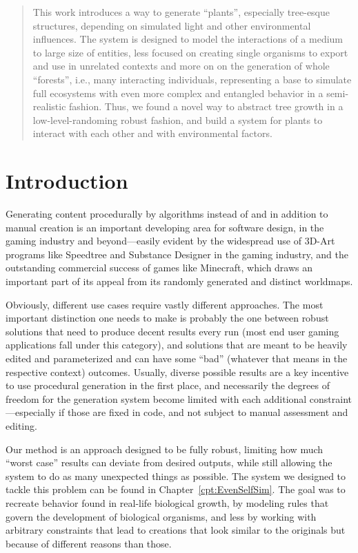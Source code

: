 \documentclass[11pt, abstract=on]{scrartcl}
\begin{document}
\begin{abstract}

This work introduces a way to generate ``plants'', especially tree-esque structures, depending on simulated light and other environmental influences. The system is designed to model the interactions of a medium to large size of entities, less focused on creating single organisms to export and use in unrelated contexts and more on on the generation of whole ``forests'', i.e., many interacting individuals, representing a base to simulate full ecosystems with even more complex and entangled behavior in a semi-realistic fashion. Thus, we found a novel way to abstract tree growth in a low-level-randoming robust fashion, and build a system for plants to interact with each other and with environmental factors.
\end{abstract}

\section{Introduction}
Generating content procedurally by algorithms instead of and in addition to manual creation is an important developing area for software design, in the gaming industry and beyond---easily evident by the widespread use of 3D-Art programs like Speedtree and Substance Designer in the gaming industry, and the outstanding commercial success of games like Minecraft, which draws an important part of its appeal from its randomly generated and distinct worldmaps.

Obviously, different use cases require vastly different approaches. The most important distinction one needs to make is probably the one between robust solutions that need to produce decent results every run (most end user gaming applications fall under this category), and solutions that are meant to be heavily edited and parameterized and can have some ``bad'' (whatever that means in the respective context) outcomes. Usually, diverse possible results are a key incentive to use procedural generation in the first place, and necessarily the degrees of freedom for the generation system become limited with each additional constraint---especially if those are fixed in code, and not subject to manual assessment and editing.

Our method is an approach designed to be fully robust, limiting how much ``worst case'' results can deviate from desired outputs, while still allowing the system to do as many unexpected things as possible. The system we designed to tackle this problem can be found in Chapter~\ref{cpt:EvenSelfSim}. The goal was to recreate behavior found in real-life biological growth, by modeling rules that govern the development of biological organisms, and less by working with arbitrary constraints that lead to creations that look similar to the originals but because of different reasons than those.
\end{document}
